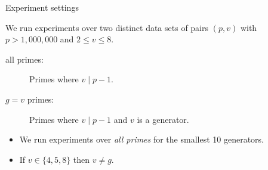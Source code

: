 
\begin{frame}{Experiment settings}

    We run experiments over two distinct data sets of pairs $(p, v)$ with $p > 1,000,000$ and $2 \leq v \leq 8$.
    
    \begin{description}
        \item[all primes:] Primes where $v \mid p -1$.
        \item[$g = v$ primes:] Primes where $v \mid p -1$ and $v$ is a generator.
    \end{description}

    \pause
    
    
    \begin{itemize}
        \item We run experiments over \emph{all primes} for the smallest 10 generators.
        \item If $v\in\{4,5,8\}$ then $v\neq g$.
    \end{itemize}
\end{frame}

